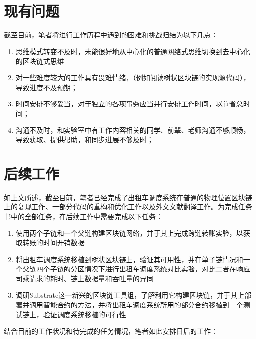 \chapter{现有问题}

截至目前，笔者将进行工作历程中遇到的困难和挑战归结为以下几点：
\begin{enumerate}
    \item 思维模式转变不及时，未能很好地从中心化的普通网络式思维切换到去中心化的区块链式思维
    \item 对一些难度较大的工作具有畏难情绪，（例如阅读树状区块链的实现源代码），导致进度不及预期；
    \item 时间安排不够妥当，对于独立的各项事务应当并行安排工作时间，以节省总时间；
    \item 沟通不及时，和实验室中有工作内容相关的同学、前辈、老师沟通不够顺畅，导致获取、提供帮助，和同步进展不够及时；

\end{enumerate}

\chapter{后续工作}

如上文所述，截至目前，笔者已经完成了出租车调度系统在普通的物理位置区块链上的复现工作、一部分代码的重构和优化工作以及外文文献翻译工作。为完成任务书中的全部任务，在后续工作中需要完成以下任务：

\begin{enumerate}
    \item 使用两个子链和一个父链构建区块链网络，并于其上完成跨链转账实验，以获取转账的时间开销数据
    \item 将出租车调度系统移植到树状区块链上，验证其可用性，并在单子链情况和一个父链四个子链的分区情况下进行出租车调度系统对比实验，对比二者在响应司乘请求的耗时、链上数据量和吞吐量的异同
    \item 调研Substrate这一新兴的区块链工具组，了解利用它构建区块链，并于其上部署并调用智能合约的方法，并将出租车调度系统所用的部分合约移植到一个测试链上，验证调度系统移植的可行性
\end{enumerate}

结合目前的工作状况和待完成的任务情况，笔者如此安排日后的工作：

